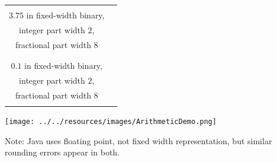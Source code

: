 \documentclass[12pt, oneside]{article}
\begin{document}
\begin{center}
\begin{tabular}{|c|p{5in}|}
\hline
& \\
$3.75$  in fixed-width binary,& \\
integer part width $2$,&\\
 fractional part width $8$ & \\
& \\
\hline
& \\
$0.1$  in fixed-width binary, & \\
integer part width $2$, &\\
 fractional part width $8$ & \\
& \\
\hline
\end{tabular}
\end{center}

\texttt{[image: ../../resources/images/ArithmeticDemo.png]}

Note: Java uses floating point, not fixed width representation, but similar rounding errors appear in both.
 
\newpage
\end{document}
